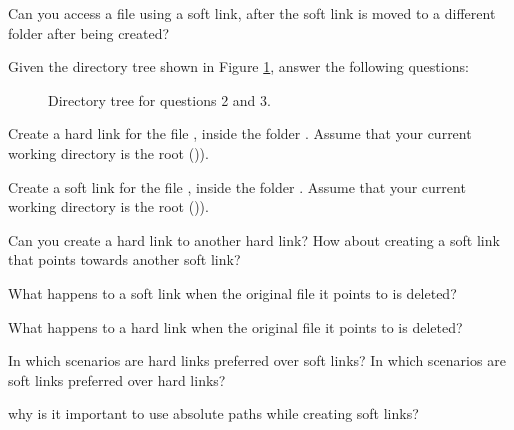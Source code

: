 \begin{exercises}
  \item Can you access a file using a soft link, after the soft link is moved to a different folder after being created?

Given the directory tree shown in Figure \ref{fig:ch7_ex_dirtree}, answer the following questions:
\begin{figure}[!htbp]
  \centering
        
        \caption{Directory tree for questions 2 and 3.}
        \label{fig:ch7_ex_dirtree}
\end{figure}
  \item Create a hard link for the file , inside the folder . Assume that your current working directory is the root ()\mycommand{/}).
  \item Create a soft link for the file , inside the folder . Assume that your current working directory is the root ()\mycommand{/}).
  \item Can you create a hard link to another hard link? How about creating a soft link that points towards another soft link?
  \item What happens to a soft link when the original file it points to is deleted?
  \item What happens to a hard link when the original file it points to is deleted?
  \item In which scenarios are hard links preferred over soft links? In which scenarios are soft links preferred over hard links?
  \item why is it important to use absolute paths while creating soft links?
\end{exercises}
